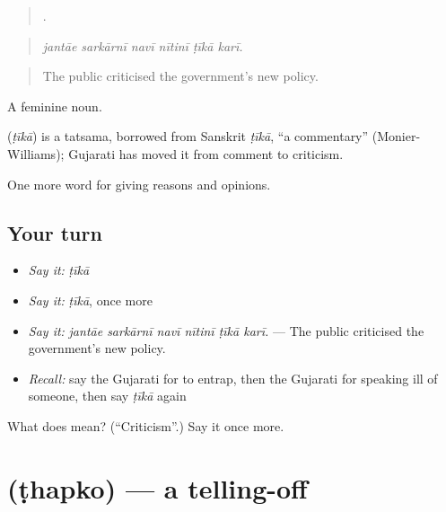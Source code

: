 \begin{quote}
     .
\end{quote}

\begin{quote}
\emph{jantāe sarkārnī navī nītinī ṭīkā karī.}
\end{quote}

\begin{quote}
The public criticised the government's new policy.
\end{quote}

A feminine noun.

\begin{cousinweb}
\textbf{} (\emph{ṭīkā}) is a tatsama, borrowed from Sanskrit \emph{ṭīkā}, \textquotedblleft{}a commentary\textquotedblright{} (Monier-Williams); Gujarati has moved it from comment to criticism.
\end{cousinweb}

\begin{grammarlens}[title={What you've built}]
One more word for giving reasons and opinions.
\end{grammarlens}

\subsection*{Your turn}
\begin{itemize}
\raggedright
  \item \emph{Say it:} \emph{ṭīkā}
  \item \emph{Say it:} \emph{ṭīkā}, once more
  \item \emph{Say it:} \emph{jantāe sarkārnī navī nītinī ṭīkā karī.} — The public criticised the government's new policy.
  \item \emph{Recall:} say the Gujarati for to entrap, then the Gujarati for speaking ill of someone, then say \emph{ṭīkā} again
\end{itemize}

\begin{tcolorbox}[breakable,colback=teal!4,colframe=teal!35!black,title={Before you move on}]
What does  mean? (\textquotedblleft{}Criticism\textquotedblright{}.) Say it once more.
\end{tcolorbox}
\section[\texorpdfstring{\gu{ઠપકો} (ṭhapko)}{ઠપકો (ṭhapko)}]{ (ṭhapko) — a telling-off}

